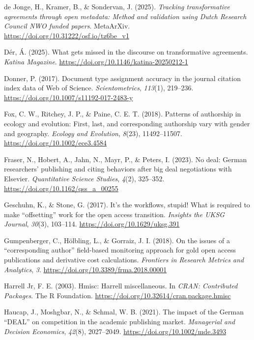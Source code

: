 \documentclass[a4paper,man,floatsintext,longtable,noextraspace,10pt]{apa6}
\newlength{\cslhangindent}
\newenvironment{CSLReferences}[2] %
{\begin{list}{}{%
  \setlength{\itemindent}{0pt}
  \setlength{\leftmargin}{0pt}
  \setlength{\parsep}{0pt}
  \ifodd #1
  \setlength{\leftmargin}{\cslhangindent}
  \setlength{\itemindent}{-1\cslhangindent}
  \fi
  \setlength{\itemsep}{#2\baselineskip}}}
{\end{list}}
\begin{document}
\begin{CSLReferences}{1}{0}
de Jonge, H., Kramer, B., \& Sondervan, J. (2025). \emph{Tracking
transformative agreements through open metadata: Method and validation
using {Dutch Research Council NWO} funded papers}. MetaArXiv.
\url{https://doi.org/10.31222/osf.io/tz6be_v1}

Dér, Á. (2025). What gets missed in the discourse on transformative
agreements. \emph{Katina Magazine}.
\url{https://doi.org/10.1146/katina-20250212-1}

Donner, P. (2017). Document type assignment accuracy in the journal
citation index data of {Web of Science}. \emph{Scientometrics},
\emph{113}(1), 219--236. \url{https://doi.org/10.1007/s11192-017-2483-y}

Fox, C. W., Ritchey, J. P., \& Paine, C. E. T. (2018). Patterns of
authorship in ecology and evolution: First, last, and corresponding
authorship vary with gender and geography. \emph{Ecology and Evolution},
\emph{8}(23), 11492--11507. \url{https://doi.org/10.1002/ece3.4584}

Fraser, N., Hobert, A., Jahn, N., Mayr, P., \& Peters, I. (2023). No
deal: German researchers' publishing and citing behaviors after big deal
negotiations with {Elsevier}. \emph{Quantitative Science Studies},
\emph{4}(2), 325--352. \url{https://doi.org/10.1162/qss_a_00255}

Geschuhn, K., \& Stone, G. (2017). It's the workflows, stupid! What is
required to make {``offsetting''} work for the open access transition.
\emph{Insights the {UKSG} Journal}, \emph{30}(3), 103--114.
\url{https://doi.org/10.1629/uksg.391}

Gumpenberger, C., Hölbling, L., \& Gorraiz, J. I. (2018). On the issues
of a {``corresponding author''} field-based monitoring approach for gold
open access publications and derivative cost calculations.
\emph{Frontiers in Research Metrics and Analytics}, \emph{3}.
\url{https://doi.org/10.3389/frma.2018.00001}

Harrell Jr, F. E. (2003). Hmisc: Harrell miscellaneous. In \emph{CRAN:
Contributed Packages}. The R Foundation.
\url{https://doi.org/10.32614/cran.package.hmisc}

Haucap, J., Moshgbar, N., \& Schmal, W. B. (2021). The impact of the
{German {``DEAL''}} on competition in the academic publishing market.
\emph{Managerial and Decision Economics}, \emph{42}(8), 2027--2049.
\url{https://doi.org/10.1002/mde.3493}


\end{CSLReferences}
\end{document}
